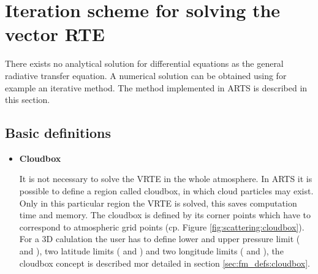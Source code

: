 \section{Iteration scheme for solving the vector RTE}
\label{sec:scattering:solution_rte}

There exists no analytical solution for differential equations as the
general radiative transfer equation. A numerical solution can be
obtained using for example an iterative method. The method implemented
in ARTS is described in this section.

\subsection{Basic definitions}
\begin{itemize}
\item{\bf Cloudbox}
  
  It is not necessary to solve the VRTE in the whole atmosphere. In
  ARTS it is possible to define a region called cloudbox, in which
  cloud particles may exist. Only in this particular region the VRTE
  is solved, this saves computation time and memory.  The cloudbox is
  defined by its corner points which have to correspond to atmospheric
  grid points (cp. Figure \ref{fig:scattering:cloudbox}). For a 3D
  calulation the user has to define lower and upper pressure limit
  ( and ), two latitude limits ( and )
  and two longitude limits ( and ), the cloudbox
  concept is described mor detailed in section
  \ref{sec:fm_defs:cloudbox}.


\end{itemize}
